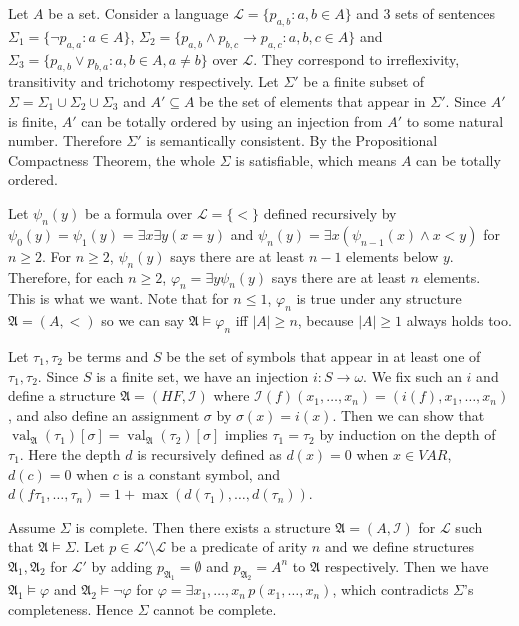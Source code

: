 \documentclass[12pt]{article}
\newcommand{\val}{\mathop{\mathrm{val}}}
\theoremstyle{definition}
\newenvironment{customthm}[1]
  {\renewcommand\theinnercustomthm{#1}\innercustomthm}
  {\endinnercustomthm}
\begin{document}
\begin{customthm}{II.7.20} Let $A$ be a set. Consider a language $\mathcal{L}=\{p_{a,b}:a,b\in A\}$ and 3 sets of sentences $\Sigma_1=\{\neg p_{a,a}:a\in A\}$, $\Sigma_2=\{p_{a,b}\wedge p_{b,c}\rightarrow p_{a,c}:a,b,c\in A\}$ and  $\Sigma_3=\{p_{a,b}\vee p_{b,a}:a,b\in A,a\neq b\}$ over $\mathcal{L}$. They correspond to irreflexivity, transitivity and trichotomy respectively. Let $\Sigma'$ be a finite subset of $\Sigma=\Sigma_1\cup\Sigma_2\cup\Sigma_3$ and $A'\subseteq A$ be the set of elements that appear in $\Sigma'$. Since $A'$ is finite, $A'$ can be totally ordered by using an injection from $A'$ to some natural number. Therefore $\Sigma'$ is semantically consistent. By the Propositional Compactness Theorem, the whole $\Sigma$ is satisfiable, which means $A$ can be totally ordered.
\end{customthm}

\begin{customthm}{II.7.21} Let $\psi_n(y)$ be a formula over $\mathcal{L}=\{<\}$ defined recursively by $\psi_0(y)=\psi_1(y)=\exists x\exists y(x=y)$ and $\psi_n(y)=\exists x(\psi_{n-1}(x)\wedge x<y)$ for $n\geq2$. For $n\geq2$, $\psi_n(y)$ says there are at least $n-1$ elements below $y$. Therefore, for each $n\geq2$, $\varphi_n=\exists y\psi_n(y)$ says there are at least $n$ elements. This is what we want. Note that for $n\leq1$, $\varphi_n$ is true under any structure $\mathfrak{A}=(A,<)$ so we can say $\mathfrak{A}\models\varphi_n$ iff $|A|\geq n$, because $|A|\geq 1$ always holds too.
\end{customthm}

\begin{customthm}{II.8.5} Let $\tau_1,\tau_2$ be terms and $S$ be the set of symbols that appear in at least one of $\tau_1,\tau_2$. Since $S$ is a finite set, we have an injection $i:S\rightarrow\omega$. We fix such an $i$ and define a structure $\mathfrak{A}=(HF,\mathcal{I})$ where $\mathcal{I}(f)(x_1,\ldots,x_n)=(i(f),x_1,\ldots,x_n)$, and also define an assignment $\sigma$ by $\sigma(x)=i(x)$. Then we can show that $\val_\mathfrak{A}(\tau_1)[\sigma]=\val_\mathfrak{A}(\tau_2)[\sigma]$ implies $\tau_1=\tau_2$ by induction on the depth of $\tau_1$. Here the depth $d$ is recursively defined as $d(x)=0$ when $x\in VAR$, $d(c)=0$ when $c$ is a constant symbol, and $d(f\tau_1,\ldots,\tau_n)=1+\max(d(\tau_1),\ldots,d(\tau_n))$.
\end{customthm}

\begin{customthm}{II.8.20} Assume $\Sigma$ is complete. Then there exists a structure $\mathfrak{A}=(A,\mathcal{I})$ for $\mathcal{L}$ such that $\mathfrak{A}\models\Sigma$. Let $p\in\mathcal{L}'\setminus\mathcal{L}$ be a predicate of arity $n$ and we define structures $\mathfrak{A}_1,\mathfrak{A}_2$ for $\mathcal{L}'$ by adding $p_{\mathfrak{A}_1}=\emptyset$ and $p_{\mathfrak{A}_2}=A^{n}$ to $\mathfrak{A}$ respectively. Then we have $\mathfrak{A}_1\models\varphi$ and $\mathfrak{A}_2\models\neg\varphi$ for $\varphi=\exists x_1,\ldots,x_n\,p(x_1,\ldots,x_n)$, which contradicts $\Sigma$'s completeness. Hence $\Sigma$ cannot be complete.
\end{customthm}
\end{document}
